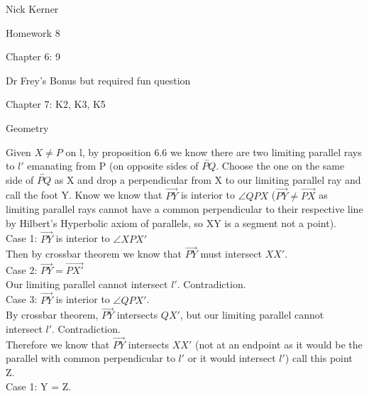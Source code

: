 \documentclass[12pt,letterpaper]{article}
\newcommand{\pro}[1]{\noindent {\bf #1}}
\begin{document}
\begin{flushright}
Nick Kerner

Homework 8

Chapter 6: 9

Dr Frey's Bonus but required fun question

Chapter 7: K2, K3, K5

\end{flushright}
\begin{center}
\large{Geometry}\\
\end{center}

\pro{Chapter 6: problem 9 }

Given $X\neq P $ on l, by proposition 6.6 we know there are two limiting parallel rays to $l'$ emanating from P (on opposite sides of $\overleftrightarrow{PQ}$.  Choose the one on the same side of $\overleftrightarrow{PQ}$ as X and drop a perpendicular from X to our limiting parallel ray and call the foot Y.   Know we know that $\overrightarrow{PY}$ is interior to $\angle QPX$ ($\overrightarrow{PY}\neq \overrightarrow{PX}$ as limiting parallel rays cannot have a common perpendicular to their respective line by Hilbert's Hyperbolic axiom of parallels, so XY is a segment not a point). \\

Case 1: $\overrightarrow{PY}$ is interior to $\angle XPX'$\\

Then by crossbar theorem we know that $\overrightarrow{PY}$ must intersect $XX'$. \\

Case 2: $\overrightarrow{PY} = \overrightarrow{PX'}$\\

Our limiting parallel cannot intersect $l'$.  Contradiction.\\

Case 3: $\overrightarrow{PY}$ is interior to $\angle QPX'$.\\

By crossbar theorem, $\overrightarrow{PY}$ intersects $QX'$, but our limiting parallel cannot intersect $l'$.  Contradiction.\\

Therefore we know that $\overrightarrow{PY}$ intersects $XX'$ (not at an endpoint as it would be the parallel with common perpendicular to $l'$ or it would intersect $l'$) call this point Z.  \\

Case 1: Y = Z.\\
\end{document}
